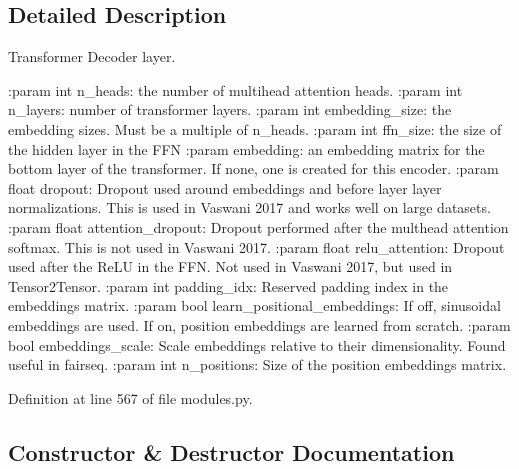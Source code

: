\subsection{Detailed Description}
\begin{DoxyVerb}Transformer Decoder layer.

:param int n_heads: the number of multihead attention heads.
:param int n_layers: number of transformer layers.
:param int embedding_size: the embedding sizes. Must be a multiple of n_heads.
:param int ffn_size: the size of the hidden layer in the FFN
:param embedding: an embedding matrix for the bottom layer of the transformer.
    If none, one is created for this encoder.
:param float dropout: Dropout used around embeddings and before layer
    layer normalizations. This is used in Vaswani 2017 and works well on
    large datasets.
:param float attention_dropout: Dropout performed after the multhead attention
    softmax. This is not used in Vaswani 2017.
:param float relu_attention: Dropout used after the ReLU in the FFN. Not used
    in Vaswani 2017, but used in Tensor2Tensor.
:param int padding_idx: Reserved padding index in the embeddings matrix.
:param bool learn_positional_embeddings: If off, sinusoidal embeddings are
    used. If on, position embeddings are learned from scratch.
:param bool embeddings_scale: Scale embeddings relative to their dimensionality.
    Found useful in fairseq.
:param int n_positions: Size of the position embeddings matrix.
\end{DoxyVerb}
 

Definition at line 567 of file modules.\+py.



\subsection{Constructor \& Destructor Documentation}
\mbox{\label{classparlai_1_1agents_1_1transformer_1_1modules_1_1TransformerDecoder_ac9356241c0dd44bf980a155124cbde59}} 
